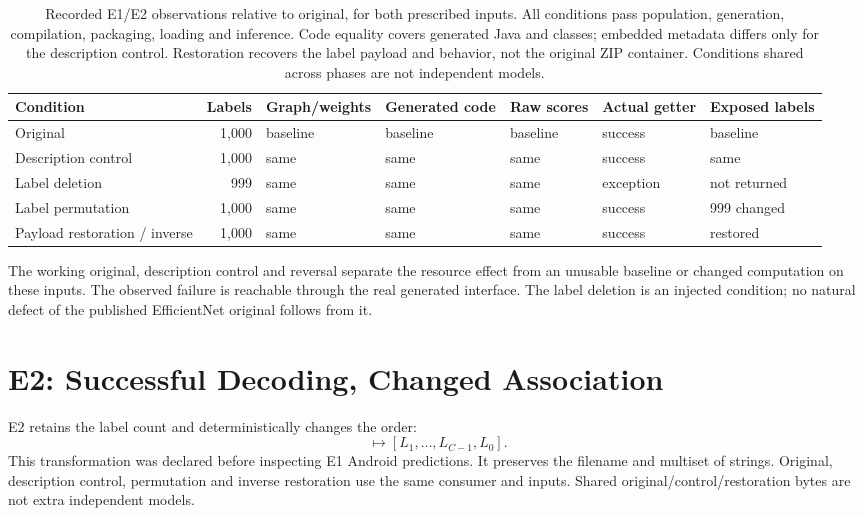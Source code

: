 \documentclass[10pt,twocolumn,letterpaper]{article}
\begin{document}
\begin{table}[t]
\centering\small
\setlength{\tabcolsep}{5pt}
\begin{tabular}{@{}lrlllll@{}}
\toprule
Condition & Labels & Graph/weights & Generated code & Raw scores & Actual getter & Exposed labels\\
\midrule
Original & 1,000 & baseline & baseline & baseline & success & baseline\\
Description control & 1,000 & same & same & same & success & same\\
Label deletion & 999 & same & same & same & exception & not returned\\
Label permutation & 1,000 & same & same & same & success & 999 changed\\
Payload restoration / inverse & 1,000 & same & same & same & success & restored\\
\bottomrule
\end{tabular}
\caption{Recorded E1/E2 observations relative to original, for both prescribed inputs. All conditions pass population, generation, compilation, packaging, loading and inference. Code equality covers generated Java and classes; embedded metadata differs only for the description control. Restoration recovers the label payload and behavior, not the original ZIP container. Conditions shared across phases are not independent models.}
\label{tab:core}
\end{table}

The working original, description control and reversal separate the resource effect from an unusable baseline or changed computation on these inputs. The observed failure is reachable through the real generated interface. The label deletion is an injected condition; no natural defect of the published EfficientNet original follows from it.

\section{E2: Successful Decoding, Changed Association}
\label{sec:e2}
E2 retains the label count and deterministically changes the order:
\begin{equation}
[L_0,L_1,\ldots,L_{C-1}]
\mapsto[L_1,\ldots,L_{C-1},L_0].
\end{equation}
This transformation was declared before inspecting E1 Android predictions. It preserves the filename and multiset of strings. Original, description control, permutation and inverse restoration use the same consumer and inputs. Shared original/control/restoration bytes are not extra independent models.
\end{document}
